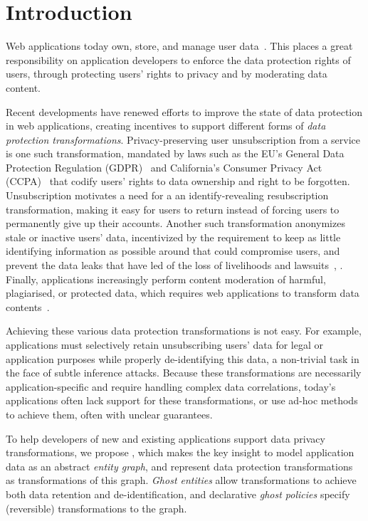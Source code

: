 \section{Introduction}
Web applications today own, store, and manage user data~\cite{nytimes:fb, npr:data}. 
This places a great responsibility on application developers to enforce the data protection rights
of users, through protecting users' rights to privacy and by moderating data content.

Recent developments have renewed efforts to improve the state of data protection in web
applications, creating incentives to support different forms of \emph{data protection
transformations}. 
%
Privacy-preserving user unsubscription from a service is one such transformation, mandated by laws
such as the EU's General Data Protection Regulation (GDPR)~\cite{eu:gdpr} and California's Consumer
Privacy Act (CCPA)~\cite{ca:privacy-act} that codify users' rights to data ownership and right to be
forgotten.  Unsubscription motivates a need for a an identify-revealing resubscription
transformation, making it easy for users to return instead of forcing users to permanently give up
their accounts.
%
Another such transformation anonymizes stale or inactive users' data, 
incentivized by the requirement to keep as little identifying information as possible
around that could compromise users, and prevent the data leaks that have led of the loss of livelihoods and
lawsuits~\cite{breach:amazon,breach:twitter, breach:fb, breach:marriott, breach:quora}, .
%
Finally, applications increasingly perform content moderation of harmful, plagiarised, or protected
data, which requires web applications to transform data contents~\cite{contentmod, sasb}.

Achieving these various data protection transformations is not easy.  For example, applications must
selectively retain unsubscribing users' data for legal or application purposes while properly
de-identifying this data, a non-trivial task in the face of subtle inference attacks.  Because these
transformations are necessarily application-specific and require handling complex data correlations,
today's applications often lack support for these transformations, or use ad-hoc methods to achieve
them, often with unclear guarantees.

To help developers of new and existing applications support data privacy transformations, we propose
\sys, which makes the key insight to model application data as an abstract \emph{entity graph}, and
represent data protection transformations as transformations of this graph. \emph{Ghost entities}
allow transformations to achieve both data retention and de-identification, and declarative
\emph{ghost policies} specify (reversible) transformations to the graph.


